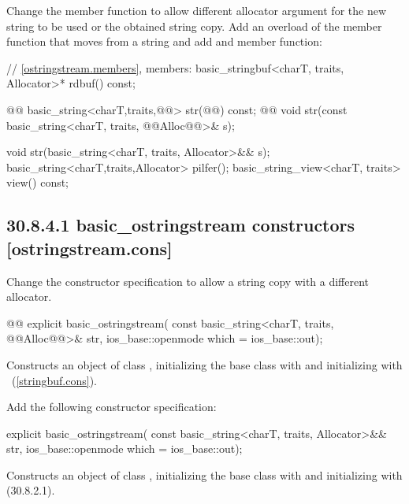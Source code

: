 \documentclass[ebook,11pt,article]{memoir}
\begin{document}
Change the  member function to allow different allocator argument for the new string to be used or the obtained string copy.
Add an overload of the  member function that moves from a string and add  and  member function:

\begin{codeblock}
    // \ref{ostringstream.members}, members:
    basic_stringbuf<charT, traits, Allocator>* rdbuf() const;

    @@
    basic_string<charT,traits,@@> str(@@) const;
    @@
    void str(const basic_string<charT, traits, @@Alloc@@>& s);
\end{codeblock}
\begin{addedblock}
\begin{codeblock}
    void str(basic_string<charT, traits, Allocator>&& s);
    basic_string<charT,traits,Allocator> pilfer();
    basic_string_view<charT, traits> view() const;
\end{codeblock}
\end{addedblock}

\subsection{30.8.4.1 basic\_ostringstream constructors [ostringstream.cons]}
Change the constructor specification to allow a string copy with a different allocator.
\begin{itemdecl}
@@
explicit basic_ostringstream(
  const basic_string<charT, traits, @@Alloc@@>& str,
  ios_base::openmode which = ios_base::out);
\end{itemdecl}

\begin{itemdescr}
\pnum
\effects
Constructs an object of class
,
initializing the base class with
and initializing  with
~(\ref{stringbuf.cons}).
\end{itemdescr}

Add the following constructor specification:
\begin{insrt}
\begin{itemdecl}
explicit basic_ostringstream(
  const basic_string<charT, traits, Allocator>&& str,
  ios_base::openmode which = ios_base::out);
\end{itemdecl}
\begin{itemdescr}
\pnum
\effects Constructs an object of class , initializing the base class with  and initializing  with  (30.8.2.1).
\end{itemdescr}
\end{insrt}
\end{document}
